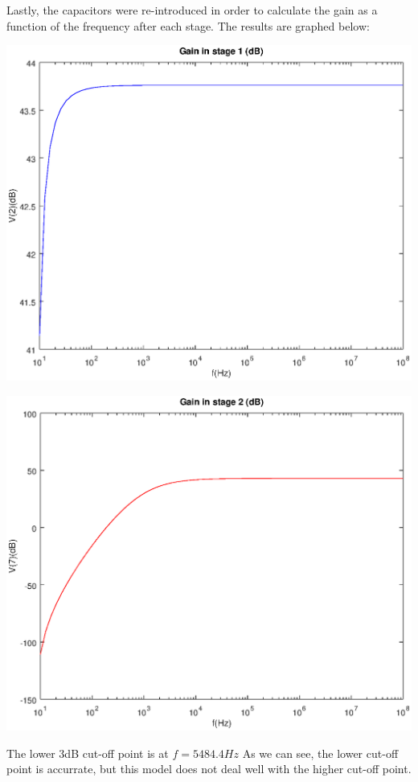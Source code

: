 Lastly, the capacitors were re-introduced in order to calculate the gain as a function of the frequency after each stage.
The results are graphed below:

\includegraphics[width=1\linewidth]{vo1.eps}

\includegraphics[width=1\linewidth]{vo2.eps}

The lower 3dB cut-off point is at $f=5484.4 Hz$
As we can see, the lower cut-off point is accurrate, but this model does not deal well with the higher cut-off point.
